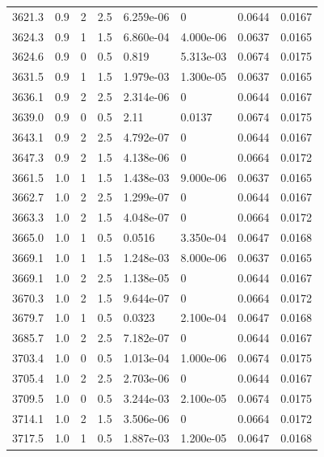 \documentclass[preview]{standalone}
\begin{document}
{{{{{{{{{{{{{\begin{tabular}{L{1.2cm}C{1.2cm} C{0.3cm}C{0.5cm} C{1.4cm}C{1.4cm} C{1.4cm}C{1.4cm}}
  3621.3  &   0.9  & 2     & 2.5 &  6.259e-06  & 0  & 0.0644 &  0.0167   \\ 
  3624.3  &   0.9  & 1     & 1.5 &  6.860e-04  & 4.000e-06  & 0.0637 &  0.0165   \\ 
  3624.6  &   0.9  & 0     & 0.5 &  0.819  & 5.313e-03  & 0.0674 &  0.0175   \\ 
  3631.5  &   0.9  & 1     & 1.5 &  1.979e-03  & 1.300e-05  & 0.0637 &  0.0165   \\ 
  3636.1  &   0.9  & 2     & 2.5 &  2.314e-06  & 0  & 0.0644 &  0.0167   \\ 
  3639.0  &   0.9  & 0     & 0.5 &  2.11  & 0.0137  & 0.0674 &  0.0175   \\ 
  3643.1  &   0.9  & 2     & 2.5 &  4.792e-07  & 0  & 0.0644 &  0.0167   \\ 
  3647.3  &   0.9  & 2     & 1.5 &  4.138e-06  & 0  & 0.0664 &  0.0172   \\ 
  3661.5  &   1.0  & 1     & 1.5 &  1.438e-03  & 9.000e-06  & 0.0637 &  0.0165   \\ 
  3662.7  &   1.0  & 2     & 2.5 &  1.299e-07  & 0  & 0.0644 &  0.0167   \\ 
  3663.3  &   1.0  & 2     & 1.5 &  4.048e-07  & 0  & 0.0664 &  0.0172   \\ 
  3665.0  &   1.0  & 1     & 0.5 &  0.0516  & 3.350e-04  & 0.0647 &  0.0168   \\ 
  3669.1  &   1.0  & 1     & 1.5 &  1.248e-03  & 8.000e-06  & 0.0637 &  0.0165   \\ 
  3669.1  &   1.0  & 2     & 2.5 &  1.138e-05  & 0  & 0.0644 &  0.0167   \\ 
  3670.3  &   1.0  & 2     & 1.5 &  9.644e-07  & 0  & 0.0664 &  0.0172   \\ 
  3679.7  &   1.0  & 1     & 0.5 &  0.0323  & 2.100e-04  & 0.0647 &  0.0168   \\ 
  3685.7  &   1.0  & 2     & 2.5 &  7.182e-07  & 0  & 0.0644 &  0.0167   \\ 
  3703.4  &   1.0  & 0     & 0.5 &  1.013e-04  & 1.000e-06  & 0.0674 &  0.0175   \\ 
  3705.4  &   1.0  & 2     & 2.5 &  2.703e-06  & 0  & 0.0644 &  0.0167   \\ 
  3709.5  &   1.0  & 0     & 0.5 &  3.244e-03  & 2.100e-05  & 0.0674 &  0.0175   \\ 
  3714.1  &   1.0  & 2     & 1.5 &  3.506e-06  & 0  & 0.0664 &  0.0172   \\ 
  3717.5  &   1.0  & 1     & 0.5 &  1.887e-03  & 1.200e-05  & 0.0647 &  0.0168   \\ 

\end{tabular}}}}}}}}}}}}}}
\end{document}
